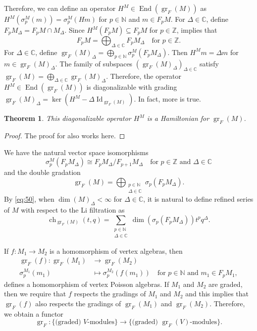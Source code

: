 \documentclass[a4paper, 12pt, reqno]{amsart}
\newtheorem{theorem}{Theorem}[section]
\theoremstyle{remark}
\numberwithin{equation}{subsection}
\DeclareMathOperator{\Id}{Id}
\DeclareMathOperator{\gr}{gr}
\DeclareMathOperator{\End}{End}
\DeclareMathOperator{\ch}{ch}
\begin{document}
Therefore, we can define an operator $H^M \in \End(\gr_F(M))$ as $H^M(\sigma^M_p(m)) = \sigma^M_p(Hm)$ for $p \in \mathbb{N}$ and $m \in F_pM$.
For $\Delta \in \mathbb{C}$, define $F_pM_{\Delta} = F_pM \cap M_{\Delta}$.
Since $H^M(F_pM) \subseteq F_pM$ for $p \in \mathbb{Z}$,  implies that
\begin{equation}
  \label{eq:49}
  F_pM = \bigoplus_{\Delta \in \mathbb{C}}F_pM_{\Delta} \quad \text{for }p \in \mathbb{Z}.
\end{equation}
For $\Delta \in \mathbb{C}$, define $\gr_F(M)_{\Delta} = \bigoplus_{p \in \mathbb{N}}\sigma^M_p(F_pM_{\Delta})$.
Then $H^Mm = \Delta m$ for $m \in \gr_F(M)_{\Delta}$.
The family of subspaces $(\gr_F(M)_{\Delta})_{\Delta \in \mathbb{C}}$ satisfy $\gr_F(M) = \bigoplus_{\Delta \in \mathbb{C}} \gr_F(M)_{\Delta}$.
Therefore, the operator $H^M \in \End(\gr_F(M))$ is diagonalizable with grading $\gr_F(M)_{\Delta} = \ker(H^M - \Delta\Id_{\gr_F(M)})$.
In fact, more is true.
\begin{theorem}
  \label{thr:48}
  This diagonalizable operator $H^M$ is a Hamiltonian for $\gr_F(M)$.
\end{theorem}

\begin{proof}
  The proof for  also works here.
\end{proof}

We have the natural vector space isomorphisms
\begin{equation*}
  \sigma^M_p(F_pM_{\Delta}) \cong F_pM_{\Delta}/F_{p + 1}M_{\Delta} \quad \text{for }p \in \mathbb{Z}\text{ and }\Delta \in \mathbb{C}
\end{equation*}
and the double gradation
\begin{equation}
  \label{eq:50}
  \gr_F(M) =\bigoplus_{\substack{p \in \mathbb{N} \\ \Delta \in \mathbb{C}}}\sigma_p(F_pM_{\Delta}).
\end{equation}
By \eqref{eq:50}, when $\dim(M)_{\Delta} < \infty$ for $\Delta \in \mathbb{C}$, it is natural to define refined series of $M$ with respect to the Li filtration as
\begin{equation*}
  \ch_{\gr_F(M)}(t, q) = \sum_{\substack{p \in \mathbb{N} \\ \Delta \in \mathbb{C}}}\dim(\sigma_p(F_pM_{\Delta}))t^pq^{\Delta}.
\end{equation*}

If $f: M_1 \to M_2$ is a homomorphism of vertex algebras, then
\begin{align*}
  \gr_F(f): \gr_F(M_1) &\to \gr_F(M_2) \\
  \sigma^{M_1}_p(m_1) &\mapsto \sigma^{M_2}_p(f(m_1)) \quad \text{for }p \in \mathbb{N}\text{ and } m_1 \in F_pM_1,
\end{align*}
defines a homomorphism of vertex Poisson algebras.
If $M_1$ and $M_2$ are graded, then we require that $f$ respects the gradings of $M_1$ and $M_2$ and this implies that $\gr_F(f)$ also respects the gradings of $\gr_F(M_1)$ and $\gr_F(M_2)$.
Therefore, we obtain a functor
\begin{equation*}
  \gr_F: \{\text{(graded) $V$-modules}\} \to \{\text{(graded) $\gr_F(V)$-modules}\}.
\end{equation*}
\end{document}
